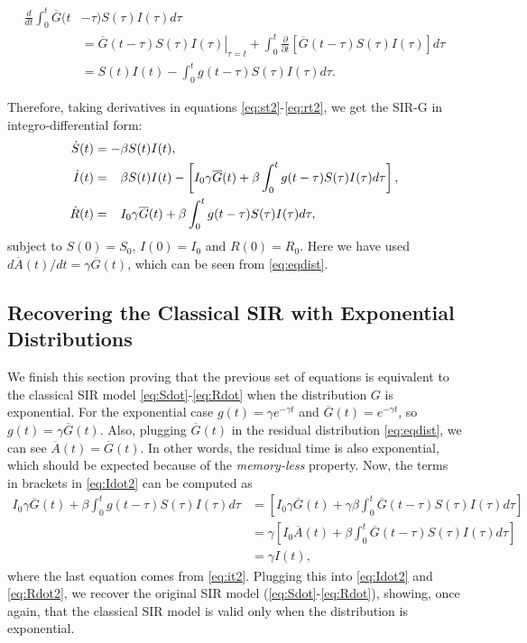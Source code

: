 \documentclass[USenglish,10pt]{article}
\newcommand{\Ab}{\overline{A}\xspace}
\newcommand{\Gb}{\overline{G}\xspace}
\newcommand{\phm}{\ensuremath\phantom{-}\xspace}
\begin{document}
\begin{align*}
\frac{d}{dt}\int_0^t  \Gb(t & -\tau) S(\tau)I(\tau)d\tau \\
        & = \left. \Gb(t-\tau) S(\tau)I(\tau) \right|_{\tau=t}
             + \int_0^t \frac{\partial}{\partial t} [\Gb(t-\tau) S(\tau)I(\tau)]d\tau \\
        & = S(t)I(t) -  \int_0^t g(t-\tau) S(\tau)I(\tau) d\tau.
\end{align*}

Therefore, taking derivatives in equations \eqref{eq:st2}-\eqref{eq:rt2}, we get the SIR-G in integro-differential form:
\begin{subequations}
	\begin{align}
		\dot S(t) &= -\beta S(t)I(t),
		\label{eq:Sdot2} \\
		\dot I(t) &= \phm  \beta  S(t)I(t) - \left[ I_0 \gamma \Gb(t) +  \beta\int_0^t g(t-\tau) S(\tau)I(\tau)d\tau \right],
		\label{eq:Idot2} \\
		\dot R(t) &= \phm I_0 \gamma \Gb(t) + \beta\int_0^t g(t-\tau) S(\tau)I(\tau)d\tau,
		\label{eq:Rdot2}
	\end{align}
\end{subequations}
subject to $S(0)=S_0$, $I(0)=I_0$ and $R(0)=R_0$.
Here we have used $d\Ab(t)/dt=\gamma\Gb(t)$, which  can be seen from \eqref{eq:eqdist}.


\subsection{Recovering the Classical SIR with Exponential Distributions}

We finish this section proving that the previous set of equations is equivalent to the classical SIR model \eqref{eq:Sdot}-\eqref{eq:Rdot} when the distribution $G$ is exponential.
For the exponential case  $g(t)=\gamma e^{-\gamma t}$ and $\Gb(t)=e^{-\gamma t}$, so $g(t)=\gamma\Gb(t)$. Also, plugging $\Gb(t)$ in the residual distribution \eqref{eq:eqdist}, we can see $\Ab(t) = \Gb(t)$. In other words, the residual time is also exponential, which should be expected because of the \textit{memory-less} property.
Now, the terms in brackets in \eqref{eq:Idot2} can be computed as
\begin{align*}
I_0 \gamma \Gb(t) + \beta\int_0^t g(t-\tau) S(\tau)I(\tau)d\tau
&= \left[ I_0  \gamma\Gb(t) + \gamma\beta\int_0^t \Gb(t-\tau) S(\tau)I(\tau)d\tau \right]\\
&= \gamma\left[ I_0  \Ab(t) + \beta\int_0^t \Gb(t-\tau) S(\tau)I(\tau)d\tau \right]\\
&= \gamma I(t),
\end{align*}
where the last equation comes from \eqref{eq:it2}.
Plugging this into \eqref{eq:Idot2} and \eqref{eq:Rdot2}, we recover the original SIR model (\eqref{eq:Sdot}-\eqref{eq:Rdot}), showing, once again, that the classical SIR model is valid only when the distribution is exponential.
\end{document}
